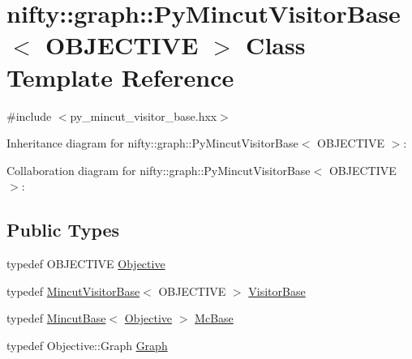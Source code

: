 \hypertarget{classnifty_1_1graph_1_1PyMincutVisitorBase}{}\section{nifty\+:\+:graph\+:\+:Py\+Mincut\+Visitor\+Base$<$ O\+B\+J\+E\+C\+T\+I\+V\+E $>$ Class Template Reference}
\label{classnifty_1_1graph_1_1PyMincutVisitorBase}


{\ttfamily \#include $<$py\+\_\+mincut\+\_\+visitor\+\_\+base.\+hxx$>$}



Inheritance diagram for nifty\+:\+:graph\+:\+:Py\+Mincut\+Visitor\+Base$<$ O\+B\+J\+E\+C\+T\+I\+V\+E $>$\+:


Collaboration diagram for nifty\+:\+:graph\+:\+:Py\+Mincut\+Visitor\+Base$<$ O\+B\+J\+E\+C\+T\+I\+V\+E $>$\+:
\subsection*{Public Types}
\begin{DoxyCompactItemize}
\item 
typedef O\+B\+J\+E\+C\+T\+I\+V\+E \hyperlink{classnifty_1_1graph_1_1PyMincutVisitorBase_a169bf3e0d36a71b236d1355ec7f74218}{Objective}
\item 
typedef \hyperlink{namespacenifty_1_1graph_abcf758110c216f393d7f20219d3fcf1b}{Mincut\+Visitor\+Base}$<$ O\+B\+J\+E\+C\+T\+I\+V\+E $>$ \hyperlink{classnifty_1_1graph_1_1PyMincutVisitorBase_ae7a2c382bd05a78dfe61b046a6cd77c5}{Visitor\+Base}
\item 
typedef \hyperlink{classnifty_1_1graph_1_1MincutBase}{Mincut\+Base}$<$ \hyperlink{classnifty_1_1graph_1_1PyMincutVisitorBase_a169bf3e0d36a71b236d1355ec7f74218}{Objective} $>$ \hyperlink{classnifty_1_1graph_1_1PyMincutVisitorBase_a02d791718472f3448f70bb7a551ad29d}{Mc\+Base}
\item 
typedef Objective\+::\+Graph \hyperlink{classnifty_1_1graph_1_1PyMincutVisitorBase_ad99444f656759acea3ff9899d074b704}{Graph}
\end{DoxyCompactItemize}
